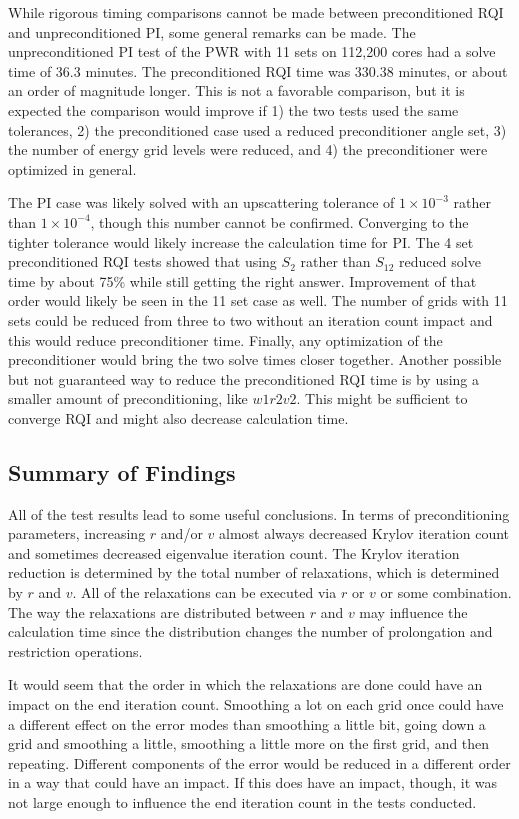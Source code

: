 While rigorous timing comparisons cannot be made between preconditioned RQI and unpreconditioned PI, some general remarks can be made. The unpreconditioned PI test of the PWR with 11 sets on 112,200 cores had a solve time of 36.3 minutes. The preconditioned RQI time was 330.38 minutes, or about an order of magnitude longer. This is not a favorable comparison, but it is expected the comparison would improve if 1) the two tests used the same tolerances, 2) the preconditioned case used a reduced preconditioner angle set, 3) the number of energy grid levels were reduced, and 4) the preconditioner were optimized in general.

The PI case was likely solved with an upscattering tolerance of $1 \times 10^{-3}$ rather than $1 \times 10^{-4}$, though this number cannot be confirmed. Converging to the tighter tolerance would likely increase the calculation time for PI. The 4 set preconditioned RQI tests showed that using $S_{2}$ rather than $S_{12}$ reduced solve time by about 75\% while still getting the right answer. Improvement of that order would likely be seen in the 11 set case as well. The number of grids with 11 sets could be reduced from three to two without an iteration count impact and this would reduce preconditioner time. Finally, any optimization of the preconditioner would bring the two solve times closer together. Another possible but not guaranteed way to reduce the preconditioned RQI time is by using a smaller amount of preconditioning, like $w1r2v2$. This might be sufficient to converge RQI and might also decrease calculation time. 

\subsection{Summary of Findings}
All of the test results lead to some useful conclusions. In terms of preconditioning parameters, increasing $r$ and/or $v$ almost always decreased Krylov iteration count and sometimes decreased eigenvalue iteration count. The Krylov iteration reduction is determined by the total number of relaxations, which is determined by $r$ and $v$. All of the relaxations can be executed via $r$ or $v$ or some combination. The way the relaxations are distributed between $r$ and $v$ may influence the calculation time since the distribution changes the number of prolongation and restriction operations. 

It would seem that the order in which the relaxations are done could have an impact on the end iteration count. Smoothing a lot on each grid once could have a different effect on the error modes than smoothing a little bit, going down a grid and smoothing a little, smoothing a little more on the first grid, and then repeating. Different components of the error would be reduced in a different order in a way that could have an impact. If this does have an impact, though, it was not large enough to influence the end iteration count in the tests conducted.  
 
